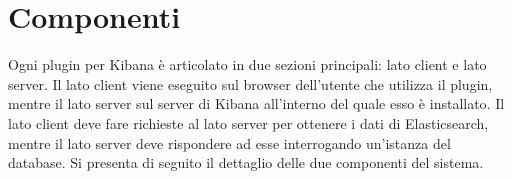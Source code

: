 \section{Componenti}

Ogni plugin per Kibana è articolato in due sezioni principali: lato client e lato server. Il lato client viene eseguito sul browser dell'utente che utilizza il plugin, mentre il lato server sul server di Kibana all'interno del quale esso è installato. Il lato client deve fare richieste al lato server per ottenere i dati di Elasticsearch, mentre il lato server deve rispondere ad esse interrogando un'istanza del database. Si presenta di seguito il dettaglio delle due componenti del sistema.
